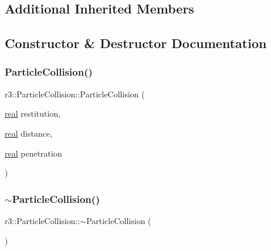 \subsection*{Additional Inherited Members}


\subsection{Constructor \& Destructor Documentation}
\mbox{\label{classr3_1_1_particle_collision_af3c52ed10e7495207bf20f3263175098}} 
\subsubsection{\texorpdfstring{Particle\+Collision()}{ParticleCollision()}}
{\footnotesize\ttfamily r3\+::\+Particle\+Collision\+::\+Particle\+Collision (\begin{DoxyParamCaption}\item[{\mbox{\hyperlink{namespacer3_ab2016b3e3f743fb735afce242f0dc1eb}{real}}}]{restitution,  }\item[{\mbox{\hyperlink{namespacer3_ab2016b3e3f743fb735afce242f0dc1eb}{real}}}]{distance,  }\item[{\mbox{\hyperlink{namespacer3_ab2016b3e3f743fb735afce242f0dc1eb}{real}}}]{penetration }\end{DoxyParamCaption})\hspace{0.3cm}{\ttfamily [explicit]}}

\mbox{\label{classr3_1_1_particle_collision_a7227b004e41a96aafd5f9a54e3b6b97e}} 
\subsubsection{\texorpdfstring{$\sim$\+Particle\+Collision()}{~ParticleCollision()}}
{\footnotesize\ttfamily r3\+::\+Particle\+Collision\+::$\sim$\+Particle\+Collision (\begin{DoxyParamCaption}{ }\end{DoxyParamCaption})\hspace{0.3cm}{\ttfamily [default]}}



